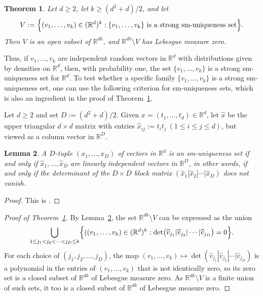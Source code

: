 \documentclass[11pt]{amsart}
\theoremstyle{plain}
\newtheorem{theorem}{Theorem}[section]
\newtheorem{lemma}[theorem]{Lemma}
\theoremstyle{remark}
\newcommand{\RR}{\mathbb{R}}
\renewcommand{\hat}{\widehat}
\begin{document}
\begin{theorem}\label{T:ssmu}
Let $d\ge2$, let $k\ge (d^2+d)/2$, and let 
\[
V:=\Bigl\{(v_1,\dots,v_k)\in (\RR^{d})^k: \{v_1,\dots,v_k\} \text{~is a strong sm-uniqueness set}\Bigr\}.
\]
Then $V$ is an open subset of $\RR^{dk}$, and $\RR^{dk}\setminus V$ has Lebesgue measure zero.
\end{theorem}

Thus, if $v_1,\dots,v_k$ are independent random vectors in $\RR^d$
with distributions given by densities on $\RR^d$, then, 
with probability one, the set $\{v_1,\dots,v_k\}$ 
is a strong sm-uniqueness set for $\RR^d$.
To test whether a specific family $\{v_1,\dots,v_k\}$ is a strong sm-uniqueness set,
one can use the following criterion for sm-uniqueness sets, 
which is also an ingredient in the proof of Theorem~\ref{T:ssmu}.

Let $d\ge2$ and set $D:=(d^2+d)/2$.
Given $x=(t_1,\dots,t_d)\in\RR^d$, 
let $\hat{x}$ be the upper triangular $d\times d$ matrix with entries 
$\hat{x}_{ij}:=t_it_j~(1\le i\le j\le d)$, 
but viewed as a column vector in $\RR^D$. 


\begin{lemma}\label{L:smu}
A $D$-tuple $(x_1,\dots,x_D)$ of vectors in $\RR^d$ is an sm-uniqueness set 
if and only if $\hat{x}_1,\dots,\hat{x}_D$
are linearly independent vectors in $\RR^D$, 
in other words, if and only if the determinant of the $D\times D$ block matrix
$(\hat{x}_1|\hat{x}_2|\cdots|\hat{x}_D)$
does not vanish. 
\end{lemma}

\begin{proof}
This is \cite[Corollary~5]{FMR23a}.
\end{proof}

	
\begin{proof}[Proof of Theorem~\ref{T:ssmu}]
By Lemma~\ref{L:smu}, the set $\RR^{dk}\setminus V$ can be expressed as the union
\[
\bigcup_{1\le j_1<j_2<\dots <j_D\le k}\Bigl\{((v_1,\dots,v_k)\in(\RR^d)^k:\det\bigl(\hat{v}_{j_1}|\hat{v}_{j_2}|\cdots|\hat{v}_{j_D}\bigr)=0\Bigr\}.
\]
For each choice of $(j_1,j_2,\dots,j_D)$, the map 
$(v_1,\dots,v_k)\mapsto \det(\hat{v}_{j_1}|\hat{v}_{j_2}|\cdots|\hat{v}_{j_D})$ is a polynomial
in the entries of $(v_1,\dots,v_k)$ that is not identically zero, so its zero set is a closed subset 
of $\RR^{dk}$ of Lebesgue measure zero. As $\RR^{dk}\setminus V$ is a finite union of such sets,
it too is a  closed subset of $\RR^{dk}$ of Lebesgue measure zero.
\end{proof}
\end{document}
